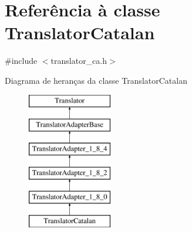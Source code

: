 \hypertarget{class_translator_catalan}{\section{Referência à classe Translator\-Catalan}
\label{class_translator_catalan}
}


{\ttfamily \#include $<$translator\-\_\-ca.\-h$>$}

Diagrama de heranças da classe Translator\-Catalan\begin{figure}[H]
\begin{center}
\leavevmode
\includegraphics[height=6.000000cm]{class_translator_catalan}
\end{center}
\end{figure}
